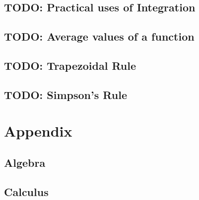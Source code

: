 \section{TODO: Practical uses of Integration}
\label{sec:PracticalUsesOfIntegration}
\lipsum[1]
\newpage
\section{TODO: Average values of a function}
\label{sec:AverageValuesOfAFunction}
\lipsum[1]
\newpage
\section{TODO: Trapezoidal Rule}
\label{sec:TrapezoidalRule}
\lipsum[1]
\newpage
\section{TODO: Simpson's Rule}
\label{sec:SimpsonsRule}
\lipsum[1]
\newpage
\chapter{Appendix}
\label{chap:Appendix}
\section{Algebra}
\lipsum[1]
\section{Calculus}
\label{sec:AppCalculus}
%
\newpage
